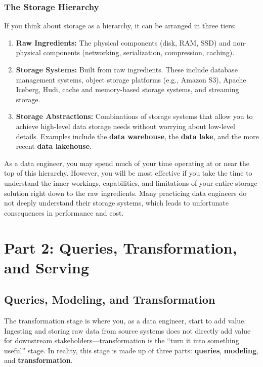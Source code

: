 \documentclass{article}
\begin{document}
\subsubsection{The Storage Hierarchy}
If you think about storage as a hierarchy, it can be arranged in three tiers:
\begin{enumerate}
    \item \textbf{Raw Ingredients:} The physical components (disk, RAM, SSD) and non-physical components (networking, serialization, compression, caching).
    \item \textbf{Storage Systems:} Built from raw ingredients. These include database management systems, object storage platforms (e.g., Amazon S3), Apache Iceberg, Hudi, cache and memory-based storage systems, and streaming storage.
    \item \textbf{Storage Abstractions:} Combinations of storage systems that allow you to achieve high-level data storage needs without worrying about low-level details. Examples include the \textbf{data warehouse}, the \textbf{data lake}, and the more recent \textbf{data lakehouse}.
\end{enumerate}
As a data engineer, you may spend much of your time operating at or near the top of this hierarchy. However, you will be most effective if you take the time to understand the inner workings, capabilities, and limitations of your entire storage solution right down to the raw ingredients. Many practicing data engineers do not deeply understand their storage systems, which leads to unfortunate consequences in performance and cost.

\newpage

\section{Part 2: Queries, Transformation, and Serving}

\subsection{Queries, Modeling, and Transformation}
The transformation stage is where you, as a data engineer, start to add value. Ingesting and storing raw data from source systems does not directly add value for downstream stakeholders---transformation is the ``turn it into something useful'' stage. In reality, this stage is made up of three parts: \textbf{queries}, \textbf{modeling}, and \textbf{transformation}.
\end{document}
